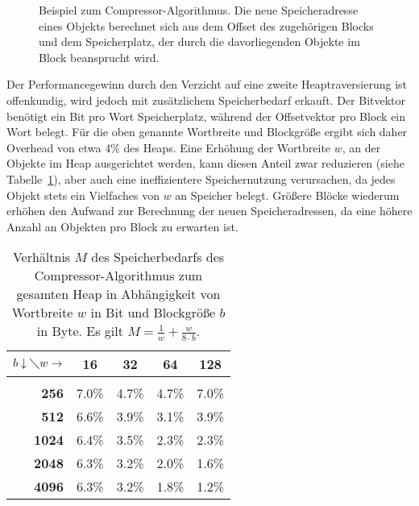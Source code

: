 \begin{figure}[h]
	\centering
	
	\caption[Beispiel zum Compressor-Algorithmus]{Beispiel zum Compressor-Algorithmus. Die neue Speicheradresse eines Objekts berechnet sich aus dem Offset des zugehörigen Blocks und dem Speicherplatz, der durch die davorliegenden Objekte im Block beansprucht wird.}
	\label{fig:compressor-example}
\end{figure}

Der Performancegewinn durch den Verzicht auf eine zweite Heaptraversierung ist offenkundig, wird jedoch mit zusätzlichem Speicherbedarf erkauft.
Der Bitvektor benötigt ein Bit pro Wort Speicherplatz, während der Offsetvektor pro Block ein Wort belegt.
Für die oben genannte Wortbreite und Blockgröße ergibt sich daher Overhead von etwa 4\% des Heaps.
Eine Erhöhung der Wortbreite $w$, an der Objekte im Heap ausgerichtet werden, kann diesen Anteil zwar reduzieren (siehe Tabelle~\ref{tab:compressor}), aber auch eine ineffizientere Speichernutzung verursachen, da jedes Objekt stets ein Vielfaches von $w$ an Speicher belegt.
Größere Blöcke wiederum erhöhen den Aufwand zur Berechnung der neuen Speicheradressen, da eine höhere Anzahl an Objekten pro Block zu erwarten ist.

\begin{table}
	\centering \renewcommand{\arraystretch}{1.15} 
	\begin{tabular}{|r|cccc|}
		\hline
		$b \downarrow \diagdown w \rightarrow$ &  \textbf{16}   &  \textbf{32}   &  \textbf{64}   &  \textbf{128}  \\ \hline
                             & \hspace{1.5cm}  &  \hspace{1.5cm}  &  \hspace{1.5cm}   &   \hspace{1.5cm}   \\[-0.6cm]
		                                 \textbf{256} & 7.0\% & 4.7\% & 4.7\% & 7.0\% \\ \hline
		                                 \textbf{512} & 6.6\% & 3.9\% & 3.1\% & 3.9\% \\ \hline
		                                \textbf{1024} & 6.4\% & 3.5\% & 2.3\% & 2.3\% \\ \hline
		                                \textbf{2048} & 6.3\% & 3.2\% & 2.0\% & 1.6\% \\ \hline
		                                \textbf{4096} & 6.3\% & 3.2\% & 1.8\% & 1.2\% \\ \hline
	\end{tabular} 

	\vspace*{0.3cm}
	
	\caption[Speicherbedarf des Compressor-Algorithmus]{Verhältnis $M$ des Speicherbedarfs des Compressor-Algorithmus zum gesamten Heap in Abhängigkeit von Wortbreite $w$ in Bit und Blockgröße $b$ in Byte. Es gilt $M = \frac{1}{w} + \frac{w}{8 \cdot b}$.}
	\label{tab:compressor}
\end{table}

